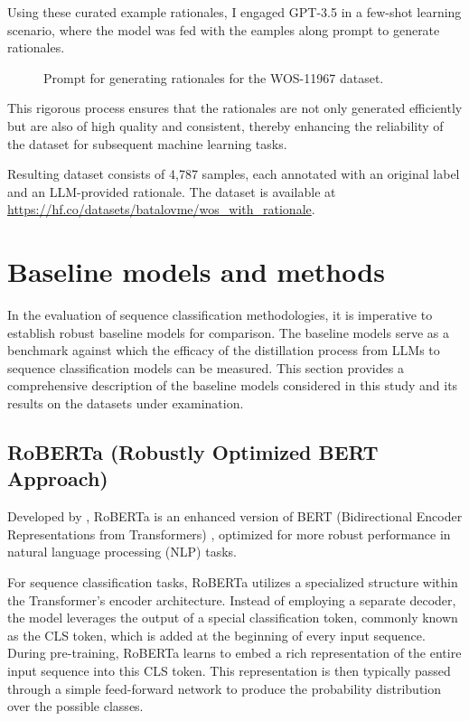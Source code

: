 Using these curated example rationales, I engaged GPT-3.5 in a few-shot learning scenario, where the model was fed with the eamples along prompt to generate rationales.

\begin{figure}[ht!]
    \centering
    
    \caption{Prompt for generating rationales for the WOS-11967 dataset.}
    \label{fig:wos_prompt}
\end{figure}

This rigorous process ensures that the rationales are not only generated efficiently but are also of high quality and consistent, thereby enhancing the reliability of the dataset for subsequent machine learning tasks.

Resulting dataset consists of 4,787 samples, each annotated with an original label and an LLM-provided rationale. The dataset is available at \linebreak \url{https://hf.co/datasets/batalovme/wos_with_rationale}.

\section{Baseline models and methods}
\label{sec:baselines}

In the evaluation of sequence classification methodologies, it is imperative to establish robust baseline models for comparison. The baseline models serve as a benchmark against which the efficacy of the distillation process from LLMs to sequence classification models can be measured. This section provides a comprehensive description of the baseline models considered in this study and its results on the datasets under examination.

\subsection{RoBERTa (Robustly Optimized BERT Approach)}

Developed by \citeauthor{roberta} \cite{roberta}, RoBERTa is an enhanced version of BERT (Bidirectional Encoder Representations from Transformers) \cite{bert}, optimized for more robust performance in natural language processing (NLP) tasks.

For sequence classification tasks, RoBERTa utilizes a specialized structure within the Transformer's encoder architecture. Instead of employing a separate decoder, the model leverages the output of a special classification token, commonly known as the CLS token, which is added at the beginning of every input sequence. During pre-training, RoBERTa learns to embed a rich representation of the entire input sequence into this CLS token. This representation is then typically passed through a simple feed-forward network to produce the probability distribution over the possible classes.


